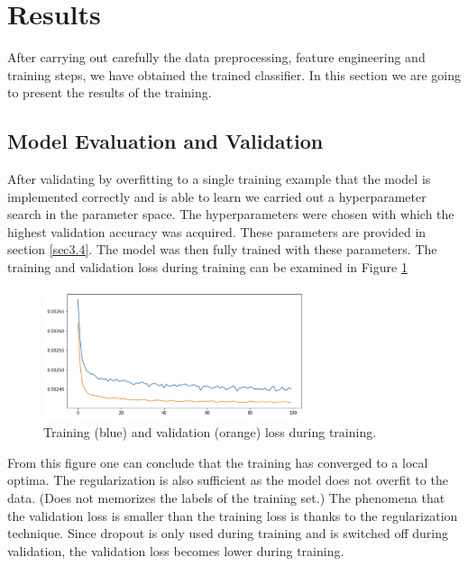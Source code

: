 \section{Results} \label{sec4}

After carrying out carefully the data preprocessing, feature engineering and training steps, we have obtained the trained classifier. In this section we are going to present the results of the training. 

\subsection{Model Evaluation and Validation}

After validating by overfitting to a single training example that the model is implemented correctly and is able to learn we carried out a hyperparameter search in the parameter space. The hyperparameters were chosen with which the highest validation accuracy was acquired. These parameters are provided in section \ref{sec3.4}. The model was then fully trained with these parameters. The training and validation loss during training can be examined in Figure \ref{fig12}

\begin{figure}[h]
	\centering
	\includegraphics[width=0.7\textwidth]{fig/loss.jpg}
	\vspace*{-0.1in}
	\caption{Training (blue) and validation (orange) loss during training.}
	\label{fig12}
	\vspace*{-0.2in}
	\bigskip
\end{figure}

From this figure one can conclude that the training has converged to a local optima. The regularization is also sufficient as the model does not overfit to the data. (Does not memorizes the labels of the training set.) The phenomena that the validation loss is smaller than the training loss is thanks to the regularization technique. Since dropout is only used during training and is switched off during validation, the validation loss becomes lower during training. 

